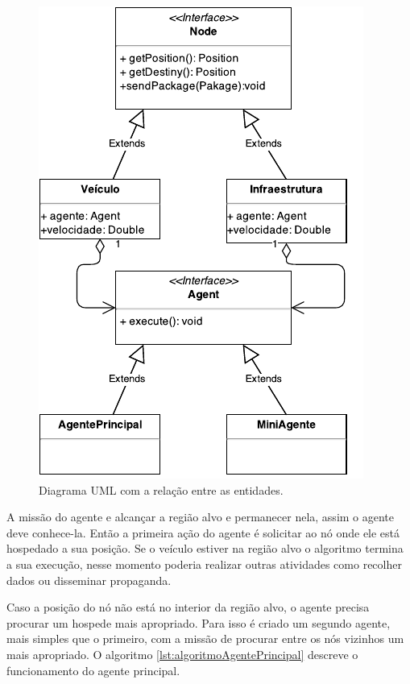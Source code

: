 \begin{figure}[htbp]
	\centering
	\includegraphics[scale=2]{metodologia/figuras/umlAtores.pdf}
	\caption{Diagrama UML com a relação entre as entidades.}
	\label{fig:umlAtores}
\end{figure}

A missão do agente e alcançar a região alvo e permanecer nela, assim o agente deve conhece-la. Então a primeira ação do agente é solicitar ao nó onde ele está hospedado a sua posição. Se o veículo estiver na região alvo o algoritmo termina a sua execução, nesse momento poderia realizar outras atividades como recolher dados ou disseminar propaganda.

Caso a posição do nó não está no interior da região alvo, o agente precisa procurar um hospede mais apropriado. Para isso é criado um segundo agente, mais simples que o primeiro, com a missão de procurar entre os nós vizinhos um mais apropriado. O algoritmo \ref{lst:algoritmoAgentePrincipal} descreve o funcionamento do agente principal.

